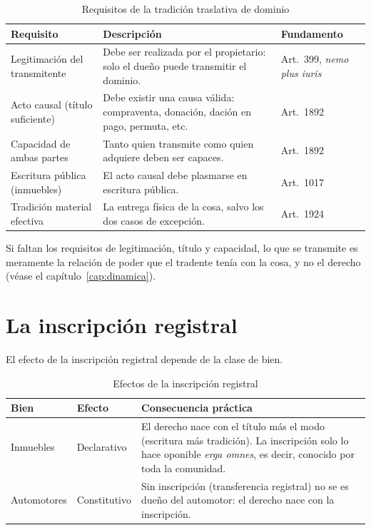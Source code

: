 \documentclass[12pt,oneside]{book}
\begin{document}
\begin{table}[H]
\centering
\small
\begin{tabularx}{\textwidth}{>{\raggedright\arraybackslash}p{}>{\raggedright\arraybackslash}X>{\raggedright\arraybackslash}p{}}
\toprule
\textbf{Requisito} & \textbf{Descripción} & \textbf{Fundamento} \\
\midrule
Legitimación del transmitente & Debe ser realizada por el propietario: solo el dueño puede transmitir el dominio. & Art.~399, \textit{nemo plus iuris} \\
Acto causal (título suficiente) & Debe existir una causa válida: compraventa, donación, dación en pago, permuta, etc. & Art.~1892 \\
Capacidad de ambas partes & Tanto quien transmite como quien adquiere deben ser capaces. & Art.~1892 \\
Escritura pública (inmuebles) & El acto causal debe plasmarse en escritura pública. & Art.~1017 \\
Tradición material efectiva & La entrega física de la cosa, salvo los dos casos de excepción. & Art.~1924 \\
\bottomrule
\end{tabularx}
\caption{Requisitos de la tradición traslativa de dominio}
\end{table}

Si faltan los requisitos de legitimación, título y capacidad, lo que se transmite es meramente la relación de poder que el tradente tenía con la cosa, y no el derecho (véase el capítulo~\ref{cap:dinamica}).

\section{La inscripción registral}

El efecto de la inscripción registral depende de la clase de bien.

\begin{table}[H]
\centering
\small
\begin{tabularx}{\textwidth}{>{\raggedright\arraybackslash}p{}>{\raggedright\arraybackslash}p{}>{\raggedright\arraybackslash}X}
\toprule
\textbf{Bien} & \textbf{Efecto} & \textbf{Consecuencia práctica} \\
\midrule
Inmuebles & Declarativo & El derecho nace con el título más el modo (escritura más tradición). La inscripción solo lo hace oponible \textit{erga omnes}, es decir, conocido por toda la comunidad. \\
Automotores & Constitutivo & Sin inscripción (transferencia registral) no se es dueño del automotor: el derecho nace con la inscripción. \\
\bottomrule
\end{tabularx}
\caption{Efectos de la inscripción registral}
\end{table}
\end{document}
